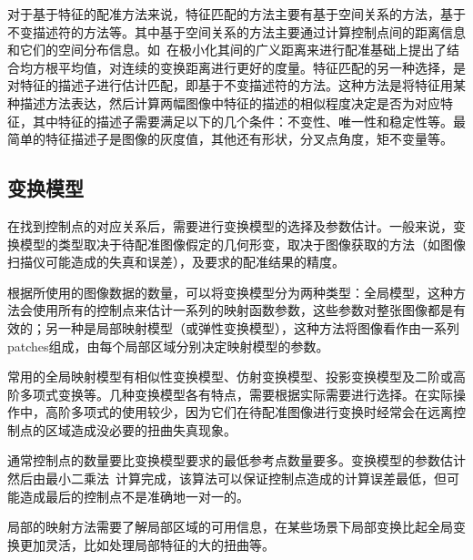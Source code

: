 对于基于特征的配准方法来说，特征匹配的方法主要有基于空间关系的方法，基于不变描述符的方法等。其中基于空间关系的方法主要通过计算控制点间的距离信息和它们的空间分布信息。如~\cite{borge}在极小化其间的广义距离来进行配准基础上提出了结合均方根平均值，对连续的变换距离进行更好的度量。特征匹配的另一种选择，是对特征的描述子进行估计匹配，即基于不变描述符的方法。这种方法是将特征用某种描述方法表达，然后计算两幅图像中特征的描述的相似程度决定是否为对应特征，其中特征的描述子需要满足以下的几个条件：不变性、唯一性和稳定性等。最简单的特征描述子是图像的灰度值，其他还有形状，分叉点角度，矩不变量等。

\subsection{变换模型}
在找到控制点的对应关系后，需要进行变换模型的选择及参数估计。一般来说，变换模型的类型取决于待配准图像假定的几何形变，取决于图像获取的方法（如图像扫描仪可能造成的失真和误差），及要求的配准结果的精度。

根据所使用的图像数据的数量，可以将变换模型分为两种类型：全局模型，这种方法会使用所有的控制点来估计一系列的映射函数参数，这些参数对整张图像都是有效的；另一种是局部映射模型（或弹性变换模型），这种方法将图像看作由一系列patches组成，由每个局部区域分别决定映射模型的参数。

常用的全局映射模型有相似性变换模型、仿射变换模型、投影变换模型及二阶或高阶多项式变换等。几种变换模型各有特点，需要根据实际需要进行选择。在实际操作中，高阶多项式的使用较少，因为它们在待配准图像进行变换时经常会在远离控制点的区域造成没必要的扭曲失真现象。

通常控制点的数量要比变换模型要求的最低参考点数量要多。变换模型的参数估计然后由最小二乘法~\cite{ume}计算完成，该算法可以保证控制点造成的计算误差最低，但可能造成最后的控制点不是准确地一对一的。

局部的映射方法需要了解局部区域的可用信息，在某些场景下局部变换比起全局变换更加灵活，比如处理局部特征的大的扭曲等。

